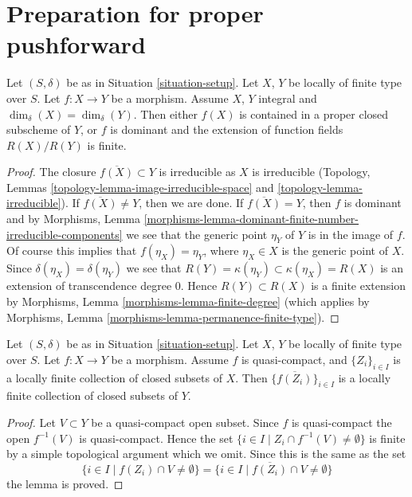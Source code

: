\section{Preparation for proper pushforward}
\label{section-preparation-pushforward}

\begin{lemma}
\label{lemma-equal-dimension}
Let $(S, \delta)$ be as in Situation \ref{situation-setup}.
Let $X$, $Y$ be locally of finite type over $S$.
Let $f : X \to Y$ be a morphism.
Assume $X$, $Y$ integral and $\dim_\delta(X) = \dim_\delta(Y)$.
Then either $f(X)$ is contained in a proper closed subscheme
of $Y$, or $f$ is dominant and the extension of function fields
$R(X)/R(Y)$ is finite.
\end{lemma}

\begin{proof}
The closure $\overline{f(X)} \subset Y$ is irreducible as $X$
is irreducible (Topology, Lemmas
\ref{topology-lemma-image-irreducible-space} and
\ref{topology-lemma-irreducible}).
If $\overline{f(X)} \not = Y$, then we are done.
If $\overline{f(X)} = Y$, then $f$ is dominant and by
Morphisms,
Lemma \ref{morphisms-lemma-dominant-finite-number-irreducible-components}
we see that the generic point $\eta_Y$ of $Y$ is in the image of $f$.
Of course this implies that $f(\eta_X) = \eta_Y$, where $\eta_X \in X$
is the generic point of $X$. Since $\delta(\eta_X) = \delta(\eta_Y)$
we see that $R(Y) = \kappa(\eta_Y) \subset \kappa(\eta_X) = R(X)$
is an extension of transcendence degree $0$.
Hence $R(Y) \subset R(X)$ is a finite extension by
Morphisms, Lemma \ref{morphisms-lemma-finite-degree}
(which applies by
Morphisms, Lemma \ref{morphisms-lemma-permanence-finite-type}).
\end{proof}

\begin{lemma}
\label{lemma-quasi-compact-locally-finite}
Let $(S, \delta)$ be as in Situation \ref{situation-setup}.
Let $X$, $Y$ be locally of finite type over $S$.
Let $f : X \to Y$ be a morphism.
Assume $f$ is quasi-compact, and $\{Z_i\}_{i \in I}$ is a locally
finite collection of closed subsets of $X$.
Then $\{\overline{f(Z_i)}\}_{i \in I}$ is a locally finite
collection of closed subsets of $Y$.
\end{lemma}

\begin{proof}
Let $V \subset Y$ be a quasi-compact open subset.
Since $f$ is quasi-compact the open $f^{-1}(V)$ is
quasi-compact. Hence the set
$\{i \in I \mid Z_i \cap f^{-1}(V) \not = \emptyset \}$
is finite by a simple topological argument which we omit.
Since this is the same as the set
$$
\{i \in I \mid f(Z_i) \cap V \not = \emptyset \} =
\{i \in I \mid \overline{f(Z_i)} \cap V \not = \emptyset \}
$$
the lemma is proved.
\end{proof}









